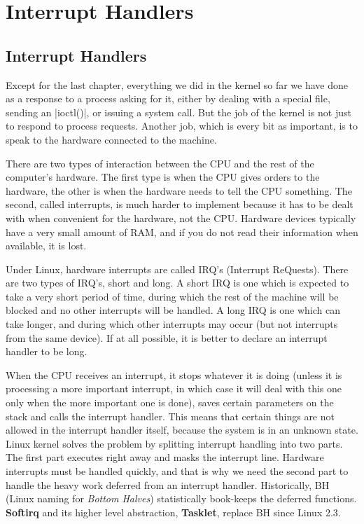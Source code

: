 \documentclass[10pt, oneside]{book}
\begin{document}

\section{Interrupt Handlers}
\label{sec:interrupt_handler}
\subsection{Interrupt Handlers}
\label{sec:irq}
Except for the last chapter, everything we did in the kernel so far we have done as a response to a process asking for it, either by dealing with a special file, sending an \cpp|ioctl()|, or issuing a system call.
But the job of the kernel is not just to respond to process requests.
Another job, which is every bit as important, is to speak to the hardware connected to the machine.

There are two types of interaction between the CPU and the rest of the computer's hardware.
The first type is when the CPU gives orders to the hardware, the other is when the hardware needs to tell the CPU something.
The second, called interrupts, is much harder to implement because it has to be dealt with when convenient for the hardware, not the CPU.
Hardware devices typically have a very small amount of RAM, and if you do not read their information when available, it is lost.

Under Linux, hardware interrupts are called IRQ's (Interrupt ReQuests).
There are two types of IRQ's, short and long.
A short IRQ is one which is expected to take a very short period of time, during which the rest of the machine will be blocked and no other interrupts will be handled.
A long IRQ is one which can take longer, and during which other interrupts may occur (but not interrupts from the same device).
If at all possible, it is better to declare an interrupt handler to be long.

When the CPU receives an interrupt, it stops whatever it is doing (unless it is processing a more important interrupt, in which case it will deal with this one only when the more important one is done),
saves certain parameters on the stack and calls the interrupt handler.
This means that certain things are not allowed in the interrupt handler itself, because the system is in an unknown state.
Linux kernel solves the problem by splitting interrupt handling into two parts.
The first part executes right away and masks the interrupt line.
Hardware interrupts must be handled quickly, and that is why we need the second part to handle the heavy work deferred from an interrupt handler.
Historically, BH (Linux naming for \textit{Bottom Halves}) statistically book-keeps the deferred functions.
\textbf{Softirq} and its higher level abstraction, \textbf{Tasklet}, replace BH since Linux 2.3.
\end{document}
